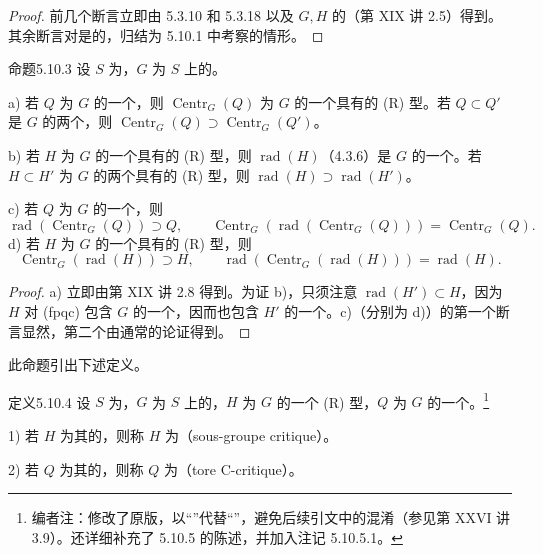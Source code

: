 \begin{proof}
前几个断言立即由 5.3.10 和 5.3.18 以及 $G,H$ 的（第 XIX 讲 2.5）得到。其余断言对是的，归结为 5.10.1 中考察的情形。
\end{proof}
\begin{SGAresult}{命题}{5.10.3}
设 $S$ 为，$G$ 为 $S$ 上的。

a) 若 $Q$ 为 $G$ 的一个，则 $\operatorname{Centr}_G(Q)$ 为 $G$ 的一个具有的 (R) 型。若 $Q\subset Q'$ 是 $G$ 的两个，则 $\operatorname{Centr}_G(Q)\supset\operatorname{Centr}_G(Q')$。

b) 若 $H$ 为 $G$ 的一个具有的 (R) 型，则 $\operatorname{rad}(H)$（4.3.6）是 $G$ 的一个。若 $H\subset H'$ 为 $G$ 的两个具有的 (R) 型，则 $\operatorname{rad}(H)\supset\operatorname{rad}(H')$。

c) 若 $Q$ 为 $G$ 的一个，则
\[\operatorname{rad}(\operatorname{Centr}_G(Q))\supset Q,\qquad
\operatorname{Centr}_G(\operatorname{rad}(\operatorname{Centr}_G(Q)))=\operatorname{Centr}_G(Q).\]
d) 若 $H$ 为 $G$ 的一个具有的 (R) 型，则
\[\operatorname{Centr}_G(\operatorname{rad}(H))\supset H,\qquad
\operatorname{rad}(\operatorname{Centr}_G(\operatorname{rad}(H)))=\operatorname{rad}(H).\]
\end{SGAresult}
\begin{proof}
a) 立即由第 XIX 讲 2.8 得到。为证 b)，只须注意 $\operatorname{rad}(H')\subset H$，因为 $H$ 对 (fpqc) 包含 $G$ 的一个，因而也包含 $H'$ 的一个。c)（分别为 d)）的第一个断言显然，第二个由通常的论证得到。
\end{proof}
此命题引出下述定义。
\begin{SGAresult}{定义}{5.10.4}
设 $S$ 为，$G$ 为 $S$ 上的，$H$ 为 $G$ 的一个 (R) 型，$Q$ 为 $G$ 的一个。\footnote{编者注：修改了原版，以“”代替“”，避免后续引文中的混淆（参见第 XXVI 讲 3.9）。还详细补充了 5.10.5 的陈述，并加入注记 5.10.5.1。}

1) 若 $H$ 为其的，则称 $H$ 为（sous-groupe critique）。

2) 若 $Q$ 为其的，则称 $Q$ 为（tore C-critique）。
\end{SGAresult}
